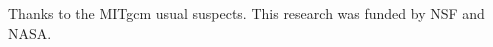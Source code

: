 \documentclass[grl]{agutex2015}
\begin{document}
\begin{article}
\begin{acknowledgments}
Thanks to the MITgcm usual suspects.
This research was funded by NSF and NASA.
\end{acknowledgments}

%
%
%
%
%
%
%
%
%





%
%
%
%


\end{article}
\end{document}
